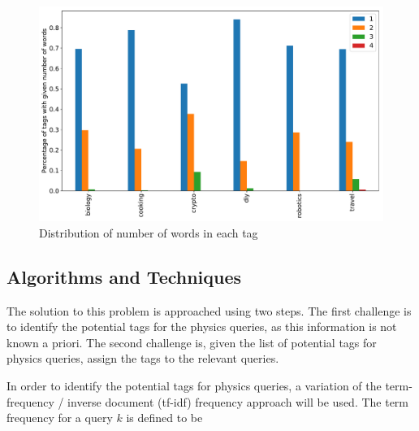 \documentclass{article}
\begin{document}
\begin{figure}[]
\includegraphics[width=\textwidth]{figures/TagWordNumberDistribution.pdf}
\caption{Distribution of number of words in each tag}
\label{fig:TagWordNumberDistribution}
\end{figure}






\subsection{Algorithms and Techniques}

The solution to this problem is approached using two steps. The first
challenge is to identify the potential tags for the physics queries, as this
information is not known a priori. The second challenge is, given the list of
potential tags for physics queries, assign the tags to the relevant
queries. 

In order to identify the potential tags for physics queries, a variation of
the term-frequency / inverse document (tf-idf) frequency approach will be
used. The term frequency for a query \(k\) is defined to be  
\end{document}
